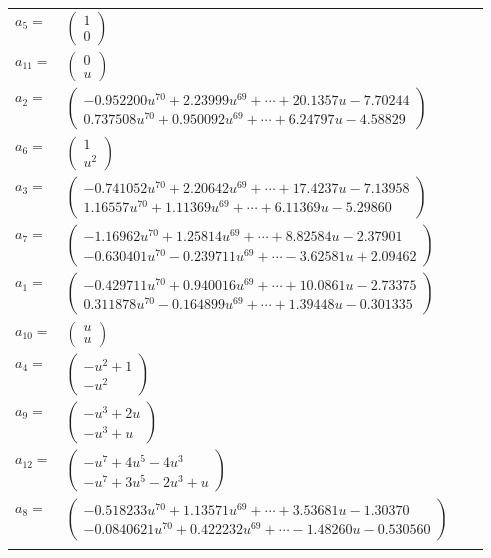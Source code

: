 \documentclass[1p]{elsarticle_modified}
\theoremstyle{definition}
\begin{document}
\begin{tabular}{m{7pt} m{180pt} m{7pt} m{180pt} }
\flushright $a_{5}=$&$\begin{pmatrix}1\\0\end{pmatrix}$ \\
\flushright $a_{11}=$&$\begin{pmatrix}0\\u\end{pmatrix}$ \\
\flushright $a_{2}=$&$\begin{pmatrix}-0.952200 u^{70}+2.23999 u^{69}+\cdots+20.1357 u-7.70244\\0.737508 u^{70}+0.950092 u^{69}+\cdots+6.24797 u-4.58829\end{pmatrix}$ \\
\flushright $a_{6}=$&$\begin{pmatrix}1\\u^2\end{pmatrix}$ \\
\flushright $a_{3}=$&$\begin{pmatrix}-0.741052 u^{70}+2.20642 u^{69}+\cdots+17.4237 u-7.13958\\1.16557 u^{70}+1.11369 u^{69}+\cdots+6.11369 u-5.29860\end{pmatrix}$ \\
\flushright $a_{7}=$&$\begin{pmatrix}-1.16962 u^{70}+1.25814 u^{69}+\cdots+8.82584 u-2.37901\\-0.630401 u^{70}-0.239711 u^{69}+\cdots-3.62581 u+2.09462\end{pmatrix}$ \\
\flushright $a_{1}=$&$\begin{pmatrix}-0.429711 u^{70}+0.940016 u^{69}+\cdots+10.0861 u-2.73375\\0.311878 u^{70}-0.164899 u^{69}+\cdots+1.39448 u-0.301335\end{pmatrix}$ \\
\flushright $a_{10}=$&$\begin{pmatrix}u\\u\end{pmatrix}$ \\
\flushright $a_{4}=$&$\begin{pmatrix}- u^2+1\\- u^2\end{pmatrix}$ \\
\flushright $a_{9}=$&$\begin{pmatrix}- u^3+2 u\\- u^3+u\end{pmatrix}$ \\
\flushright $a_{12}=$&$\begin{pmatrix}- u^7+4 u^5-4 u^3\\- u^7+3 u^5-2 u^3+u\end{pmatrix}$ \\
\flushright $a_{8}=$&$\begin{pmatrix}-0.518233 u^{70}+1.13571 u^{69}+\cdots+3.53681 u-1.30370\\-0.0840621 u^{70}+0.422232 u^{69}+\cdots-1.48260 u-0.530560\end{pmatrix}$\\&\end{tabular}
\end{document}
